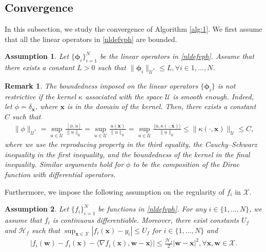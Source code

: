 \documentclass[10pt,reqno]{amsart}
\newcommand{\1}{{\chi}}
\def\leq{\leqslant}
\numberwithin{equation}{section}
\theoremstyle{thmlemcorr}
\numberwithin{theorem}{section}
\theoremstyle{thmlemcorr*}
\theoremstyle{defi}
\newtheorem{hyp}{Assumption}
\theoremstyle{remexample}
\newtheorem{remark}[theorem]{Remark}
\theoremstyle{ass}
\begin{document}
\subsection{Convergence}
\label{subsecConv}
In this subsection, we study the convergence of Algorithm \ref{alg:1}.  We first assume that all the linear operators in \eqref{nldefvph} are  bounded. 
\begin{hyp}
	\label{hypnlphibd}
	Let $\{\boldsymbol{\phi}_i\}_{i=1}^N$  be the linear operators in \eqref{nldefvph}. Assume that there exists a constant $L>0$ such that  $\|\boldsymbol{\phi}_i\|_{\mathcal{U}^*}\leq L, \forall i\in {1, \dots, N}$. 
\end{hyp}
\begin{remark}
	The boundedness imposed on the linear operators $\{\boldsymbol{\phi}_i\}$ is not restrictive if the kernel $\kappa$ associated with the space $\mathcal{U}$ is smooth enough. Indeed, let $\phi=\delta_{\boldsymbol{x}}$, where $\boldsymbol{x}$ is in the domain of the kernel. Then, there exists a constant $C$ such that
	\begin{align*}
		\|\phi\|_{\mathcal{U}^*} = \sup_{u\in \mathcal{U}}\frac{[\phi, u]}{\|u\|_{\mathcal{U}}} = \sup_{u\in \mathcal{U}}\frac{u(\boldsymbol{x})}{\|u\|_{\mathcal{U}}} = \sup_{u\in \mathcal{U}}\frac{\langle u, \kappa(\cdot, \boldsymbol{x})\rangle}{\|u\|_{\mathcal{U}}}\leq \|\kappa(\cdot, \boldsymbol{x})\|_{\mathcal{U}} \leq C,
	\end{align*}
	where we use the reproducing property in the third equality, the Cauchy--Schwarz inequality in the first inequality, and the boundedness of the kernel in the final inequality. Similar arguments hold for $\phi$ to be the composition of the Dirac function with differential operators. 
\end{remark}

Furthermore, we impose the following assumption on the regularity of $f_i$ in $\mathcal{X}$. 
\begin{hyp}
	\label{hypf}
	Let $\{f_i\}_{i=1}^N$ be functions in \eqref{nldefvph}. 
	For any $i\in \{1,\dots,N\}$, we assume that $f_i$ is continuous differentiable. Moreover, there exist constants $U_f$ and $\mathcal{H}_f$ such that $\sup_{\boldsymbol{x}\in \mathcal{X}}|f_i(\boldsymbol{x})-{y}_i|\leq U_f$ for $i \in \{1, \dots, N\}$ and 
	\begin{align}
		\label{condfi}
		|f_i(\boldsymbol{w}) - f_i(\boldsymbol{x}) - \langle \nabla f_i(\boldsymbol{x}), \boldsymbol{w} - \boldsymbol{x}\rangle | \leq \frac{\mathcal{H}_f}{2}|\boldsymbol{w}-\boldsymbol{x}|^2, \forall \boldsymbol{x}, \boldsymbol{w}\in \mathcal{X}.   
	\end{align}
\end{hyp}
\end{document}
